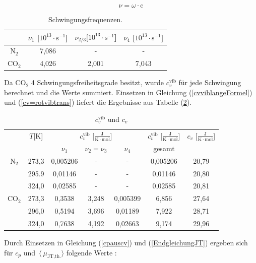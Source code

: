 \documentclass[a4paper,12pt,oneside,onecolum,final,openany]{report}
\begin{document}
\begin{equation}
\nu = \omega \cdot \mathrm{c} \label{KreisfrequenzUmrechnung}
\end{equation}


\begin{table}\caption{Schwingungsfrequenzen.} \label{TabelleSchwingungsfrequenzen}
\begin{tabular}{c|c|c|c} 
& $\nu_{1}$ [$ 10^{13} \cdot \text{s}^{-1}$]& $\nu_{2/3} [10^{13} \cdot \text{s}^{-1}$]& $\nu_{4}$ [$ 10^{13} \cdot \text{s}^{-1}$]\\
\hline
$\mathrm{N}_2$&7,086&-&-\\
$\mathrm{CO}_2$& 4,026&	2,001&7,043\\
\end{tabular}
\end{table}


Da $\mathrm{CO}_2$ 4 Schwingungsfreiheitsgrade besitzt, wurde $c_v^\mathrm{ vib}$ für jede Schwingung berechnet und die Werte summiert. Einsetzen in Gleichung (\ref{cvviblangeFormel}) und (\ref{cv=rotvibtrans}) liefert die Ergebnisse aus Tabelle (\ref{cvvibundcvTabelle}).\\

\begin{table}\caption{$c_v^\mathrm{vib}$ und $c_v$} \label{cvvibundcvTabelle}
\begin{tabular}{c|c|c|c|c|c|c}
&$T$[K]& \multicolumn{3}{|c|}{$c_v^\mathrm{vib}$ [$\frac{\mathrm{J}}{\mathrm{K}\cdot \mathrm{mol}}$] }&$c_v^\mathrm{vib}$ [$\frac{\mathrm{J}}{\mathrm{K}\cdot \mathrm{mol}}$] & $ c_v$ [$\frac{\mathrm{J}}{\mathrm{K}\cdot \mathrm{mol}}$] \\
&&$\nu_{1}$&$\nu_{2} = \nu_{3}$&$\nu_{4}$&gesamt&\\
\hline

	  $\text{N}_\mathrm{2}$ & 273,3&  0,005206&-& - &  0,005206 &20,79\\
	   & 295.9  &0,01146&-&-& 0,01146 &20,80\\
	  & 324,0 &0,02585 &-&-& 0,02585 & 20,81\\
\hline  
$\mathrm{CO}_2$&273,3&0,3538&	3,248&	0,005399&6,856&27,64\\
&296,0&0,5194&	3,696&	0,01189&7,922&28,71\\
&324,0& 0,7638&	4,192&	0,02663&9,174&29,96\\
\end{tabular}
\end{table}
\FloatBarrier

Durch Einsetzen in Gleichung (\ref{cpauscv}) und (\ref{EndgleichungJT}) ergeben sich für $c_p$ und~$\langle~\mu_{\text{JT,th.}}\rangle$ folgende Werte :\\
\end{document}
